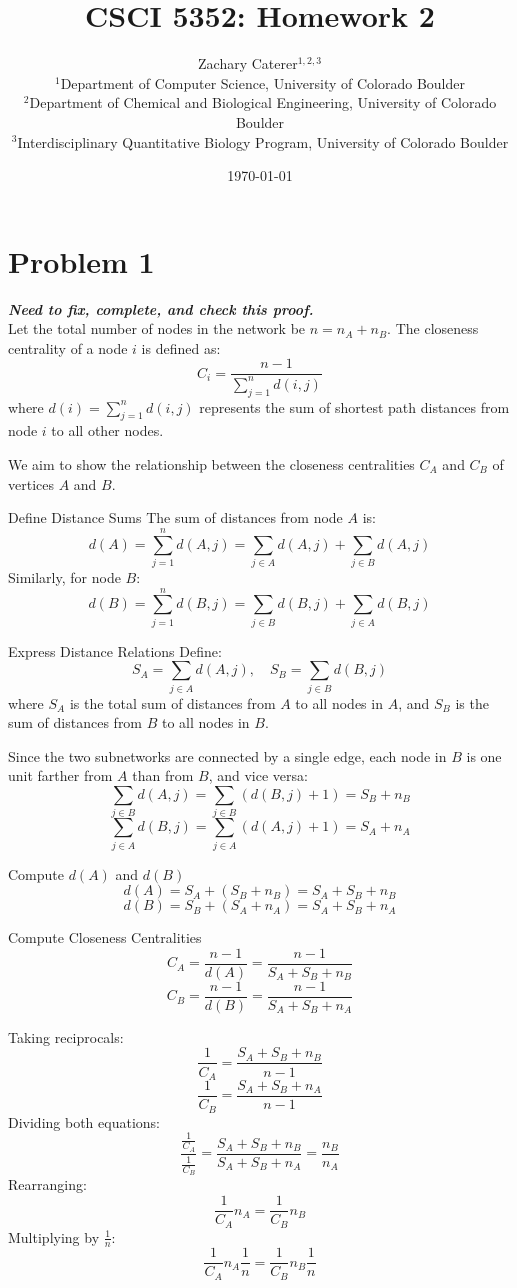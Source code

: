 \documentclass[12pt]{article}
\title{CSCI 5352: Homework 2}
\author{
    Zachary Caterer$^{1,2,3}$ \\
    \small $^1$Department of Computer Science, University of Colorado Boulder \\
    \small $^2$Department of Chemical and Biological Engineering, University of Colorado Boulder \\
    \small $^3$Interdisciplinary Quantitative Biology Program, University of Colorado Boulder
}
\date{\today}
\begin{document}
\maketitle

\section*{Problem 1}

\textit{\textbf{Need to fix, complete, and check this proof.}}\\
Let the total number of nodes in the network be \( n = n_A + n_B \). The closeness centrality of a node \( i \) is defined as:
\[
C_i = \frac{n-1}{\sum_{j=1}^{n} d(i,j)}
\]
where \( d(i) = \sum_{j=1}^{n} d(i,j) \) represents the sum of shortest path distances from node \( i \) to all other nodes.

We aim to show the relationship between the closeness centralities \( C_A \) and \( C_B \) of vertices \( A \) and \( B \). 

Define Distance Sums
The sum of distances from node \( A \) is:
\[
d(A) = \sum_{j=1}^{n} d(A,j) = \sum_{j \in A} d(A,j) + \sum_{j \in B} d(A,j)
\]
Similarly, for node \( B \):
\[
d(B) = \sum_{j=1}^{n} d(B,j) = \sum_{j \in B} d(B,j) + \sum_{j \in A} d(B,j)
\]

 Express Distance Relations
Define:
\[
S_A = \sum_{j \in A} d(A,j), \quad S_B = \sum_{j \in B} d(B,j)
\]
where \( S_A \) is the total sum of distances from \( A \) to all nodes in \( A \), and \( S_B \) is the sum of distances from \( B \) to all nodes in \( B \).

Since the two subnetworks are connected by a single edge, each node in \( B \) is one unit farther from \( A \) than from \( B \), and vice versa:
\[
\sum_{j \in B} d(A,j) = \sum_{j \in B} (d(B,j) + 1) = S_B + n_B
\]
\[
\sum_{j \in A} d(B,j) = \sum_{j \in A} (d(A,j) + 1) = S_A + n_A
\]

Compute \( d(A) \) and \( d(B) \)
\[
d(A) = S_A + (S_B + n_B) = S_A + S_B + n_B
\]
\[
d(B) = S_B + (S_A + n_A) = S_A + S_B + n_A
\]

Compute Closeness Centralities
\[
C_A = \frac{n-1}{d(A)} = \frac{n-1}{S_A + S_B + n_B}
\]
\[
C_B = \frac{n-1}{d(B)} = \frac{n-1}{S_A + S_B + n_A}
\]


Taking reciprocals:
\[
\frac{1}{C_A} = \frac{S_A + S_B + n_B}{n-1}
\]
\[
\frac{1}{C_B} = \frac{S_A + S_B + n_A}{n-1}
\]
Dividing both equations:
\[
\frac{\frac{1}{C_A}}{\frac{1}{C_B}} = \frac{S_A + S_B + n_B}{S_A + S_B + n_A} = \frac{n_B}{n_A}
\]
Rearranging:
\[
\frac{1}{C_A} n_A = \frac{1}{C_B} n_B
\]
Multiplying by \( \frac{1}{n} \):
\[
\frac{1}{C_A} n_A \frac{1}{n} = \frac{1}{C_B} n_B \frac{1}{n}
\]
\end{document}
